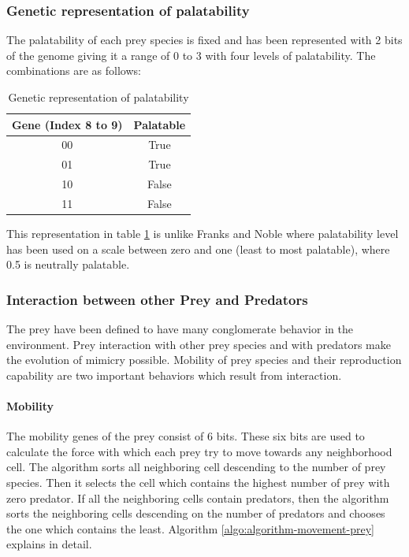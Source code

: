 \documentclass[letterpaper]{article}
\numberwithin{equation}{section}
\begin{document}
\subsubsection{Genetic representation of palatability}
\label{sec:genetic-palatability-representation}
The palatability of each prey species is fixed and has been represented with 2 bits of the genome giving it a range of 0 to 3 with four levels of palatability. The combinations are as follows:

\begin{table}[H]
	\centering
	\begin{tabular}{|c|c|}
		\hline
			\textbf{Gene (Index 8 to 9)} &	\textbf{Palatable} \\ \hline
			00									& True 			\\ \hline
			01									& True 			\\ \hline
			10									& False 		\\ \hline
			11									& False 		\\
		\hline
	\end{tabular}
	\caption{Genetic representation of palatability}
	\label{tab:genetic-representation-palatability}
\end{table}

This representation in table \ref{tab:genetic-representation-palatability} is unlike Franks and Noble \cite{franks2003} where palatability level has been used on a scale between zero and one (least to most palatable), where 0.5 is neutrally palatable. 

\subsubsection{Interaction between other Prey and Predators}
The prey have been defined to have many conglomerate behavior in the environment. Prey interaction with other prey species and with predators make the evolution of mimicry possible. Mobility of prey species and their reproduction capability are two important behaviors which result from interaction. 

\paragraph{Mobility}
The mobility genes of the prey consist of 6 bits. These six bits are used to calculate the force with which each prey try to move towards any neighborhood cell. The algorithm sorts all neighboring cell descending to the number of prey species. Then it selects the cell which contains the highest number of prey with zero predator. If all the neighboring cells contain predators, then the algorithm sorts the neighboring cells descending on the number of predators and chooses the one which contains the least. Algorithm \ref{algo:algorithm-movement-prey} explains in detail.
\end{document}
